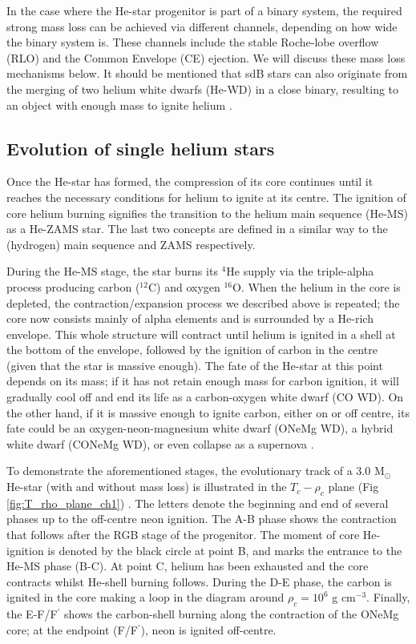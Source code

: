 \documentclass[../../main/thesis_msc.tex]{subfiles}
\begin{document}
				In the case where the He-star progenitor is part of a binary system, the required strong mass loss can be achieved via different channels, depending on how wide the binary system is. These channels include the stable Roche-lobe overflow (RLO) and the Common Envelope (CE) ejection. We will discuss these mass loss mechanisms below.
				It should be mentioned that sdB stars can also originate from the merging of two helium white dwarfs (He-WD) in a close binary, resulting to an object with enough mass to ignite helium \citep{Han2002}.
				
				
			
			\subsection{Evolution of single helium stars}
			 
				Once the He-star has formed, the compression of its core continues until it reaches the necessary conditions for helium to ignite at its centre. The ignition of core helium burning signifies the transition to the helium main sequence (He-MS) as a He-ZAMS star. The last two concepts are defined in a similar way to the (hydrogen) main sequence and ZAMS respectively.
				
				During the He-MS stage, the star burns its $^4$He supply via the triple-alpha process producing carbon ($^{12}$C) and oxygen $^{16}$O. When the helium in the core is depleted, the contraction/expansion process we described above is repeated; the core now consists mainly of alpha elements and is surrounded by a He-rich envelope. This whole structure will contract until helium is ignited in a shell at the bottom of the envelope, followed by the ignition of carbon in the centre (given that the star is massive enough). The fate of the He-star at this point depends on its mass; if it has not retain enough mass for carbon ignition, it will gradually cool off and end its life as a carbon-oxygen white dwarf (CO WD). On the other hand, if it is massive enough to ignite carbon, either on or off centre, its fate could be an oxygen-neon-magnesium white dwarf (ONeMg WD), a hybrid white dwarf (CONeMg WD), or even collapse as a supernova \citep[see][]{Denissenkov:2013qaa, chen:stu108}.
				
				
				To demonstrate the aforementioned stages, the evolutionary track of a $3.0$ M$_{\odot}$ He-star (with and without mass loss) is illustrated in the $T_c - \rho_c$ plane (Fig \ref{fig:T_rho_plane_ch1}) \citep[see also][]{Habets_a, Habets_b, Nomoto1987}. The letters denote the beginning and end of several phases up to the off-centre neon ignition. The A-B phase shows the contraction that follows after the RGB stage of the progenitor. The moment of core He-ignition is denoted by the black circle at point B, and marks the entrance to the He-MS phase (B-C). At point C, helium has been exhausted and the core contracts whilst He-shell burning follows. During the D-E phase, the carbon is ignited in the core making a loop in the diagram around $\rho_c = 10^6$ g cm$^{-3}$. Finally, the E-F/F$^\prime$ shows the carbon-shell burning along the contraction of the ONeMg core; at the endpoint (F/F$^\prime$), neon is ignited off-centre.
				
\end{document}
